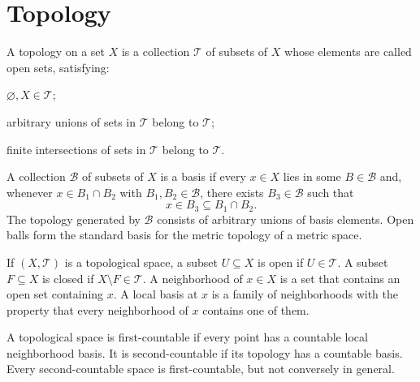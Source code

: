     \chapter{Topology}



    \begin{definition}[Topology]
        A topology on a set $X$ is a collection $\mathcal{T}$ of subsets of $X$
        whose elements are called open sets, satisfying:
        \begin{conditionlist}
            \item $\varnothing,X\in\mathcal{T}$;
            \item arbitrary unions of sets in $\mathcal{T}$ belong to
            $\mathcal{T}$;
            \item finite intersections of sets in $\mathcal{T}$ belong to
            $\mathcal{T}$.
        \end{conditionlist}
    \end{definition}


    \begin{definition}
        A collection $\mathcal{B}$ of subsets of $X$ is a basis if every
        $x\in X$ lies in some $B\in\mathcal{B}$ and, whenever
        $x\in B_1\cap B_2$ with $B_1,B_2\in\mathcal{B}$, there exists
        $B_3\in\mathcal{B}$ such that
        \[
            x\in B_3\subseteq B_1\cap B_2.
        \]
        The topology generated by $\mathcal{B}$ consists of arbitrary unions
        of basis elements. Open balls form the standard basis for the metric
        topology of a metric space.
    \end{definition}


    \begin{definition}
        If $(X,\mathcal{T})$ is a topological space, a subset $U\subseteq X$ is
        open if $U\in\mathcal{T}$. A subset $F\subseteq X$ is closed if
        $X\setminus F\in\mathcal{T}$. A neighborhood of $x\in X$ is a set that
        contains an open set containing $x$. A local basis at $x$ is a family
        of neighborhoods with the property that every neighborhood of $x$
        contains one of them.
    \end{definition}

    \begin{definition}
        A topological space is first-countable if every point has a countable
        local neighborhood basis. It is second-countable if its topology has a
        countable basis. Every second-countable space is first-countable, but
        not conversely in general.
    \end{definition}


